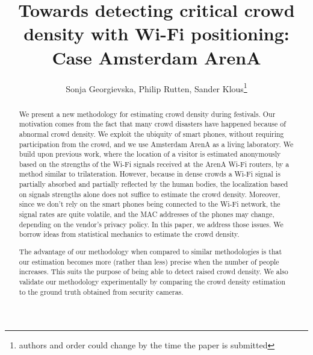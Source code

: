 \documentclass[10pt,a4paper]{article}
\begin{document}
\title{Towards detecting critical crowd density with Wi-Fi positioning: Case Amsterdam ArenA}
\author{Sonja Georgievska, Philip Rutten,  Sander Klous\footnote{authors and order could change by the time the paper is submitted}}
\maketitle

\begin{abstract}

We present a new methodology for estimating crowd density during festivals. Our motivation comes from the fact that many crowd disasters have happened because of abnormal crowd density. We exploit the ubiquity of smart phones, without requiring participation from the crowd, and we use Amsterdam ArenA as a living laboratory. We build upon previous work, where the location of a visitor is estimated anonymously based on the strengths of the Wi-Fi signals received at the ArenA Wi-Fi routers,  by a method similar to trilateration. However, because in dense crowds a Wi-Fi signal is partially absorbed and partially reflected by the human bodies, the localization based on signals strengths alone does not suffice to estimate the crowd density. Moreover, since we don't rely on the smart phones being connected to the Wi-Fi network, the signal rates are quite volatile, and the MAC addresses of the phones may change, depending on the vendor's privacy policy. In this paper, we address those issues. We borrow ideas from statistical mechanics to estimate the crowd density.  
The advantage of our methodology when compared to similar methodologies is that our estimation becomes more (rather than less) precise when the number of people increases. This suits the purpose of being able to detect raised crowd density. 
We also validate our methodology experimentally by comparing the crowd density estimation to the ground truth obtained from security cameras. 
	

\end{abstract}
\end{document}
